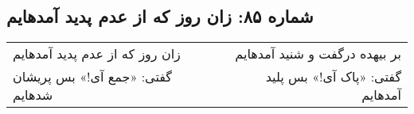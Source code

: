 \begin{center}
\section*{شماره ۸۵: زان روز که از عدم پدید آمدهایم}
\label{sec:085}
\begin{longtable}{l p{0.5cm} r}
زان روز که از عدم پدید آمدهایم
&&
بر بیهده درگفت و شنید آمدهایم
\\
گفتی: «جمع آی!» بس پریشان شدهایم
&&
گفتی: «پاک آی!» بس پلید آمدهایم
\\
\end{longtable}
\end{center}
